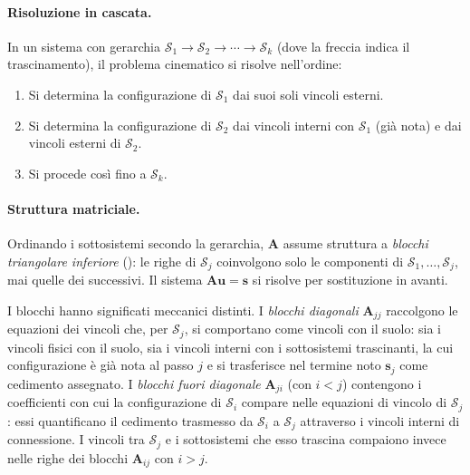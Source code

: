 \paragraph{Risoluzione in cascata.}
In un sistema con gerarchia $\mathcal{S}_1 \to \mathcal{S}_2
\to \cdots \to \mathcal{S}_k$ (dove la freccia indica il
trascinamento), il problema cinematico si risolve nell'ordine:
\begin{enumerate}[label=(\arabic*), leftmargin=*,
	itemsep=2pt]
	\item Si determina la configurazione di $\mathcal{S}_1$ dai
	suoi soli vincoli esterni.
	\item Si determina la configurazione di $\mathcal{S}_2$ dai
	vincoli interni con $\mathcal{S}_1$ (già nota) e dai vincoli
	esterni di $\mathcal{S}_2$.
	\item Si procede così fino a $\mathcal{S}_k$.
\end{enumerate}


\paragraph{Struttura matriciale.}
Ordinando i sottosistemi secondo la gerarchia, $\bm{A}$
assume struttura a \emph{blocchi triangolare inferiore}
(): le righe di
$\mathcal{S}_j$ coinvolgono solo le componenti di
$\mathcal{S}_1, \ldots, \mathcal{S}_j$, mai quelle dei
successivi. Il sistema $\bm{A}\bm{u} = \bm{s}$ si risolve
per sostituzione in avanti.
	
	



	
	I blocchi hanno significati meccanici distinti.
	I \emph{blocchi diagonali} $\bm{A}_{jj}$ raccolgono
	le equazioni dei vincoli che, per $\mathcal{S}_j$,
	si comportano come vincoli con il suolo: sia i
	vincoli fisici con il suolo, sia i vincoli interni
	con i sottosistemi trascinanti, la cui configurazione
	è già nota al passo $j$ e si trasferisce nel termine
	noto $\bm{s}_j$ come cedimento assegnato. I
	\emph{blocchi fuori diagonale} $\bm{A}_{ji}$
	(con $i < j$) contengono i coefficienti con cui
	la configurazione di $\mathcal{S}_i$ compare nelle
	equazioni di vincolo di $\mathcal{S}_j$: essi
	quantificano il cedimento trasmesso da
	$\mathcal{S}_i$ a $\mathcal{S}_j$ attraverso i
	vincoli interni di connessione. I vincoli tra
	$\mathcal{S}_j$ e i sottosistemi che esso trascina
	compaiono invece nelle righe dei blocchi
	$\bm{A}_{ij}$ con $i > j$.
	
